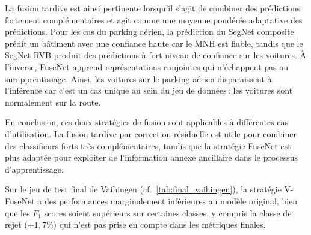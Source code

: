 La fusion tardive est ainsi pertinente lorsqu'il s'agit de combiner des prédictions fortement complémentaires et agit comme une moyenne pondérée adaptative des prédictions. Pour les cas du parking aérien, la prédiction du SegNet composite prédit un bâtiment avec une confiance haute car le \gls{MNH} est fiable, tandis que le SegNet \gls{RVB} produit des prédictions à fort niveau de confiance sur les voitures. À l'inverse, FuseNet apprend représentations conjointes qui n'échappent pas au surapprentissage. Ainsi, les voitures sur le parking aérien disparaissent à l'inférence car c'est un cas unique au sein du jeu de données\,: les voitures sont normalement sur la route.

En conclusion, ces deux stratégies de fusion sont applicables à différentes cas d'utilisation. La fusion tardive par correction résiduelle est utile pour combiner des classifieurs forts très complémentaires, tandis que la stratégie FuseNet est plus adaptée pour exploiter de l'information annexe ancillaire dans le processus d'apprentissage.

Sur le jeu de test final de Vaihingen (cf.~\cref{tab:final_vaihingen}), la stratégie V-FuseNet a des performances marginalement inférieures au modèle original, bien que les $F_1$ scores soient supérieurs sur certaines classes, y compris la classe de rejet ($+1,7\%$) qui n'est pas prise en compte dans les métriques finales.

